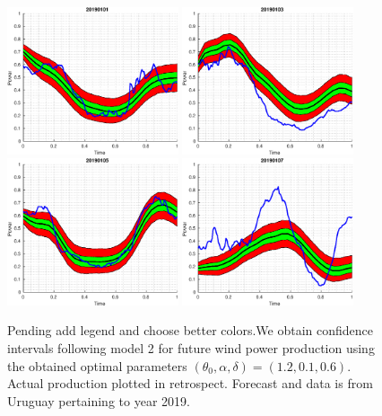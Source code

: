 \documentclass[11pt]{article}
\theoremstyle{definition}
\begin{document}
\begin{figure}[H]
\centering
\includegraphics[width=0.45\textwidth]{plots/bands_testing_days/1.eps}
\includegraphics[width=0.45\textwidth]{plots/bands_testing_days/2.eps}\\
\includegraphics[width=0.45\textwidth]{plots/bands_testing_days/3.eps}
\includegraphics[width=0.45\textwidth]{plots/bands_testing_days/4.eps}
\caption{{\color{red}Pending add legend and choose better colors.}We obtain confidence intervals following model 2  for future wind power production using the obtained optimal parameters $(\theta_0, \alpha ,\delta)=(1.2,0.1,0.6)$. Actual production plotted in retrospect. Forecast and data is from Uruguay pertaining to  year 2019.}
\end{figure}
\end{document}
